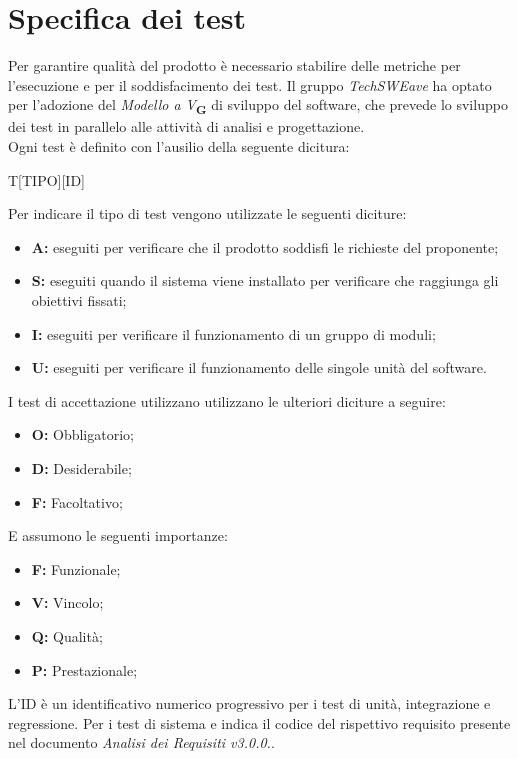 \section{Specifica dei test}
Per garantire qualità del prodotto è necessario stabilire delle metriche per l’esecuzione e per il soddisfacimento dei test.
Il gruppo \textit{TechSWEave} ha optato per l'adozione del \textit{Modello a V}\textsubscript{\textbf{G}} di sviluppo del software, che
prevede lo sviluppo dei test in parallelo alle attività di analisi e progettazione.\\
Ogni test è definito con l'ausilio della seguente dicitura:\\
\begin{center}
    T[TIPO][ID]
\end{center}
Per indicare il tipo di test vengono utilizzate le seguenti diciture:
\begin{itemize}
    \item \textbf{A:} eseguiti per verificare che il prodotto soddisfi le richieste del proponente;
    \item \textbf{S:} eseguiti quando il sistema viene installato per verificare che raggiunga gli obiettivi fissati;
    \item \textbf{I:} eseguiti per verificare il funzionamento di un gruppo di moduli;
    \item \textbf{U:} eseguiti per verificare il funzionamento delle singole unità del software.
\end{itemize}
I test di accettazione utilizzano utilizzano le ulteriori diciture a seguire:
\begin{itemize}
    \item \textbf{O:} Obbligatorio;
    \item \textbf{D:} Desiderabile;
    \item \textbf{F:} Facoltativo;
\end{itemize}
E assumono le seguenti importanze:
\begin{itemize}
    \item \textbf{F:} Funzionale;
    \item \textbf{V:} Vincolo;
    \item \textbf{Q:} Qualità;
    \item \textbf{P:} Prestazionale;
\end{itemize}
L'ID è un identificativo numerico progressivo per i test di unità, integrazione e regressione. Per i test di sistema e
indica il codice del rispettivo requisito presente nel documento \textit{Analisi dei Requisiti v3.0.0.}.\\
